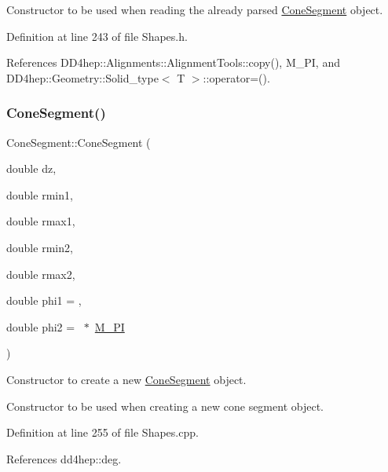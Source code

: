 Constructor to be used when reading the already parsed \hyperlink{class_d_d4hep_1_1_geometry_1_1_cone_segment}{Cone\+Segment} object. 



Definition at line 243 of file Shapes.\+h.



References D\+D4hep\+::\+Alignments\+::\+Alignment\+Tools\+::copy(), M\+\_\+\+PI, and D\+D4hep\+::\+Geometry\+::\+Solid\+\_\+type$<$ T $>$\+::operator=().

\hypertarget{class_d_d4hep_1_1_geometry_1_1_cone_segment_a678511761af3275a6f07099fd0b7854f}{}\label{class_d_d4hep_1_1_geometry_1_1_cone_segment_a678511761af3275a6f07099fd0b7854f} 
\subsubsection{\texorpdfstring{Cone\+Segment()}{ConeSegment()}\hspace{0.1cm}{\footnotesize\ttfamily [5/5]}}
{\footnotesize\ttfamily Cone\+Segment\+::\+Cone\+Segment (\begin{DoxyParamCaption}\item[{double}]{dz,  }\item[{double}]{rmin1,  }\item[{double}]{rmax1,  }\item[{double}]{rmin2,  }\item[{double}]{rmax2,  }\item[{double}]{phi1 = {},  }\item[{double}]{phi2 = {~$\ast$~\hyperlink{_x_m_l_elements_8h_ae71449b1cc6e6250b91f539153a7a0d3}{M\+\_\+\+PI}} }\end{DoxyParamCaption})}



Constructor to create a new \hyperlink{class_d_d4hep_1_1_geometry_1_1_cone_segment}{Cone\+Segment} object. 

Constructor to be used when creating a new cone segment object. 

Definition at line 255 of file Shapes.\+cpp.



References dd4hep\+::deg.



